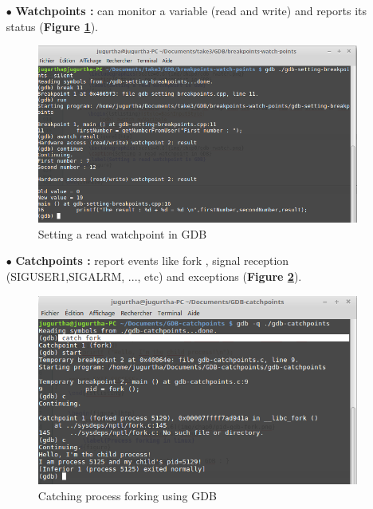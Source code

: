 \begin{itemize}
\begin{itemize}
\item[$\bullet$] \textbf{Watchpoints : } can monitor a variable (read and write) and reports its status (\textbf{Figure \ref{Setting a read watchpoint in GDB}}).
\begin{figure}[H]
		\centering
        \includegraphics[scale=0.32]{img/solution/gdb-awatch.png}
        \caption{Setting a read watchpoint in GDB}
        \label{Setting a read watchpoint in GDB}
    \end{figure}
    
    
\item[$\bullet$] \textbf{Catchpoints : } report events like fork , signal reception (SIGUSER1,SIGALRM, ..., etc) and exceptions (\textbf{Figure \ref{Catching process forking using GDB}}).
\begin{figure}[H]
		\centering
        \includegraphics[scale=0.32]{img/solution/gdb-fork-got-catch.png}
        \caption{Catching process forking using GDB}
        \label{Catching process forking using GDB}
    \end{figure}
    



\end{itemize}
\end{itemize}

